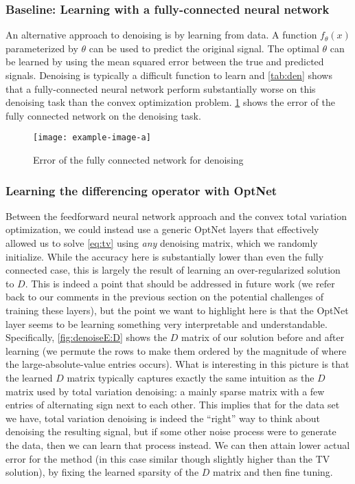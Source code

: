 \subsubsection{Baseline: Learning with a fully-connected neural network}
An alternative approach to denoising is by learning from data.
A function $f_\theta(x)$ parameterized by $\theta$ can
be used to predict the original signal.
The optimal $\theta$ can be learned by using
the mean squared error between the true and predicted signals.
Denoising is typically a difficult function to learn and
\cref{tab:den} shows that a fully-connected neural network perform
substantially worse on this denoising task than the
convex optimization problem.
\cref{fig:denoise:fc} shows the error of the fully connected
network on the denoising task.

\begin{figure}[h]
    \centering
    \texttt{[image: example-image-a]}
    \caption{Error of the fully connected network for denoising}
    \label{fig:denoise:fc}
\end{figure}

\subsubsection{Learning the differencing operator with OptNet}
Between the feedforward neural network approach and the convex total variation
optimization, we could instead use a generic OptNet layers that effectively
allowed us to solve \eqref{eq:tv} using \emph{any} denoising matrix, which we
randomly initialize.  While the accuracy here is substantially lower
than even the fully connected case, this is largely the result of learning an
over-regularized solution to $D$.  This is indeed a point that should be
addressed in future work (we refer back to our comments in the previous section
on the potential challenges of training these layers), but the point we want to
highlight here is that the OptNet layer seems to be learning something very
interpretable and understandable.  Specifically, \cref{fig:denoiseE:D}
shows the $D$ matrix of our solution before and after learning (we permute the
rows to make them ordered by the magnitude of where the large-absolute-value
entries occurs).  What is interesting in this picture is that the learned $D$
matrix typically captures exactly the same intuition as the $D$ matrix used by
total variation denoising: a mainly sparse matrix with a few entries of
alternating sign next to each other.  This implies that for the data set we
have, total variation denoising is indeed the ``right'' way to think about
denoising the resulting signal, but if some other noise process were to generate
the data, then we can learn that process instead.  We can then attain lower
actual error for the method (in this case similar though slightly higher than
the TV solution), by fixing the learned sparsity of the $D$ matrix and then fine
tuning.

